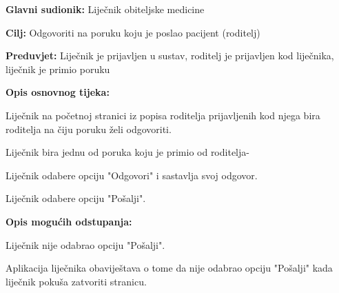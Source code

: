 					\noindent {}
					\begin{packed_item}
						
						\item \textbf{Glavni sudionik: }Liječnik obiteljske medicine
						\item  \textbf{Cilj:} Odgovoriti na poruku koju je poslao pacijent (roditelj)
						\item  \textbf{Preduvjet:} Liječnik je prijavljen u sustav, roditelj je prijavljen kod liječnika, liječnik je primio poruku
						\item  \textbf{Opis osnovnog tijeka:}
						
						\item[] \begin{packed_enum}
							
							\item Liječnik na početnoj stranici iz popisa roditelja prijavljenih kod njega bira roditelja na čiju poruku želi odgovoriti.
							\item Liječnik bira jednu od poruka koju je primio od roditelja-
							\item Liječnik odabere opciju "Odgovori" i sastavlja svoj odgovor.
							\item Liječnik odabere opciju "Pošalji".
						\end{packed_enum}
						
						\item  \textbf{Opis mogućih odstupanja:}
						
						\item[] \begin{packed_item}
							
							\item[3.a] Liječnik nije odabrao opciju "Pošalji".
							\item[] \begin{packed_enum}
								
								\item Aplikacija liječnika obaviještava o tome da nije odabrao opciju "Pošalji" kada liječnik pokuša zatvoriti stranicu.
							\end{packed_enum}
							
							
						\end{packed_item}
						
						
					\end{packed_item}
					
